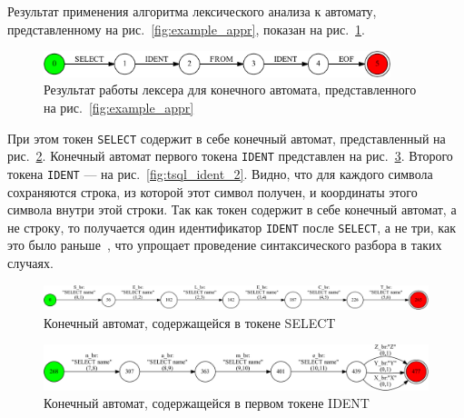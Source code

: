 Результат применения алгоритма лексического анализа к автомату, представленному на рис.~\ref{fig:example_appr}, показан на рис.~\ref{fig:example_lexer}.
\begin{figure}[H]
\begin{center}
\includegraphics[width=0.9\textwidth]{Polubelova/tsql_test_appr}
\caption{Результат работы лексера для конечного автомата, представленного на рис.~\ref{fig:example_appr}}
\label{fig:example_lexer} 
\end{center}
\end{figure}

При этом токен \verb|SELECT| содержит в себе конечный автомат, представленный на рис.~\ref{fig:tsql_select}. Конечный автомат первого токена \verb|IDENT| представлен на рис.~\ref{fig:tsql_ident_1}. Второго токена \verb|IDENT| --- на рис.~\ref{fig:tsql_ident_2}. Видно, что для каждого символа сохраняются строка, из которой этот символ получен, и координаты этого символа внутри этой строки. Так как токен содержит в себе конечный автомат, а не строку, то получается один идентификатор \verb|IDENT| после \verb|SELECT|, а не три, как это было раньше~\cite{Verbitskaya, Polubelova}, что упрощает проведение синтаксического разбора в таких случаях.  

\begin{figure}[H]
\begin{center}
\includegraphics[width=1.0\textwidth]{Polubelova/tsql_select}
\caption{Конечный автомат, содержащейся в токене SELECT}
\label{fig:tsql_select} 
\end{center}
\end{figure}

\begin{figure}[H]
\begin{center}
\includegraphics[width=1.0\textwidth]{Polubelova/tsql_ident_1}
\caption{Конечный автомат, содержащейся в первом токене IDENT}
\label{fig:tsql_ident_1} 
\end{center}
\end{figure}

